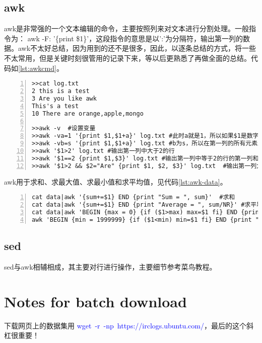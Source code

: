 \subsection{awk}
awk是非常强的一个文本编辑的命令，主要按照列来对文本进行分割处理。一般指令为： awk -F: '\{print \$1\}'，这段指令的意思是以':'为分隔符，输出第一列的数据。awk不太好总结，因为用到的还不是很多，因此，以逐条总结的方式，将一些不太常用，但是关键时刻很管用的记录下来，等以后更熟悉了再做全面的总结。代码如\ref{lst:awkcmd}。
\begin{lstlisting}[language = shell, numbers=left, label={lst:awkcmd},
     numberstyle=\tiny,keywordstyle=\color{blue!70}, caption={awk指令的一般性操作}, 
     commentstyle=\color{red!50!green!50!blue!50},frame=shadowbox,
     rulesepcolor=\color{red!20!green!20!blue!20},basicstyle=\ttfamily]
>>cat log.txt
2 this is a test
3 Are you like awk
This's a test
10 There are orange,apple,mongo

>>awk -v  #设置变量
>>awk -va=1 '{print $1,$1+a}' log.txt #此时a就是1，所以如果$1是数字，那么数字加一，如果不是，那么输出就是1
>>awk -vb=s '{print $1,$1+a}' log.txt #b为s，所以在第一列的所有元素后面加个s
>>awk '$1>2' log.txt #输出第一列中大于2的行
>>awk '$1==2 {print $1,$3}' log.txt #输出第一列中等于2的行的第一列和第三列
>>awk '$1>2 && $2="Are" {print $1, $2, $3}' log.txt  #输出第一列大于2的行的第一、二和三列
\end{lstlisting}

awk用于求和、求最大值、求最小值和求平均值，见代码\ref{lst:awk-data}。
\begin{lstlisting}[language = shell, numbers=left, label={lst:awk-data},
     numberstyle=\tiny,keywordstyle=\color{blue!70}, caption={awk求和、求平均、求最大最小值},
     commentstyle=\color{red!50!green!50!blue!50},frame=shadowbox,
     rulesepcolor=\color{red!20!green!20!blue!20},basicstyle=\ttfamily]
cat data|awk '{sum+=$1} END {print "Sum = ", sum}'  #求和
cat data|awk '{sum+=$1} END {print "Average = ", sum/NR}' #求平均值
cat data|awk 'BEGIN {max = 0} {if ($1>max) max=$1 fi} END {print "Max=", max}' #求最大值
awk 'BEGIN {min = 1999999} {if ($1<min) min=$1 fi} END {print "Min=", min}' #求最小值
\end{lstlisting}

\subsection{sed}
sed与awk相辅相成，其主要对行进行操作，主要细节参考菜鸟教程。



\section{Notes for batch download}
下载网页上的数据集用 \textcolor{blue}{wget -r -np https://irclogs.ubuntu.com/}，最后的这个斜杠很重要！

